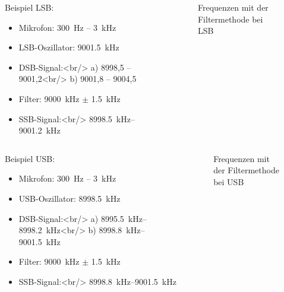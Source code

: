 \begin{frame}
\begin{columns}
    \begin{column}{0.48\textwidth}
    Beispiel LSB:

\begin{itemize}
  \item Mikrofon: \qty{300}{\hertz} -- \qty{3}{\kilo\hertz}
  \item LSB-Oszillator: \qty{9001,5}{\kilo\hertz}
  \item DSB-Signal:<br/> a) 8998,5 -- 9001,2<br/> b) 9001,8 -- 9004,5 
  \item Filter: \qty{9000}{\kilo\hertz}  $\pm$  \qty{1,5}{\kilo\hertz}
  \item SSB-Signal:<br/> \qtyrange{8998,5}{9001,2}{\kilo\hertz}
  \end{itemize}

    \end{column}
   \begin{column}{0.48\textwidth}
       
\begin{figure}
    \caption{\scriptsize Frequenzen mit der Filtermethode bei LSB}
    \label{e_ssb_modulation_lsb}
\end{figure}


   \end{column}
\end{columns}

\end{frame}

\begin{frame}
\begin{columns}
    \begin{column}{0.48\textwidth}
    Beispiel USB:

\begin{itemize}
  \item Mikrofon: \qty{300}{\hertz} -- \qty{3}{\kilo\hertz}
  \item USB-Oszillator: \qty{8998,5}{\kilo\hertz}
  \item DSB-Signal:<br/> a) \qtyrange{8995,5}{8998,2}{\kilo\hertz}<br/> b) \qtyrange{8998,8}{9001,5}{\kilo\hertz}
  \item Filter: \qty{9000}{\kilo\hertz}  $\pm$  \qty{1,5}{\kilo\hertz}
  \item SSB-Signal:<br/> \qtyrange{8998,8}{9001,5}{\kilo\hertz}
  \end{itemize}

    \end{column}
   \begin{column}{0.48\textwidth}
       
\begin{figure}
    \caption{\scriptsize Frequenzen mit der Filtermethode bei USB}
    \label{e_ssb_modulation_usb}
\end{figure}


   \end{column}
\end{columns}

\end{frame}

